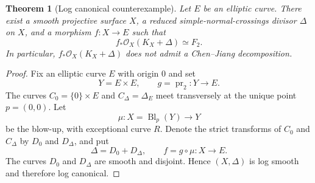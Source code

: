 \documentclass[11pt,letterpaper]{article}
\theoremstyle{paper}
\newtheorem{theorem}{Theorem}[section]
\newcommand{\OO}{\mathcal O}
\DeclareMathOperator{\pr}{pr}
\DeclareMathOperator{\Bl}{Bl}
\begin{document}
\begin{theorem}[Log canonical counterexample]\label{thm:lc}
Let $E$ be an elliptic curve. There exist a smooth projective surface $X$, a reduced simple-normal-crossings divisor $\Delta$ on $X$, and a morphism $f:X\to E$ such that
\[
f_*\OO_X(K_X+\Delta)\simeq F_2.
\]
In particular, $f_*\OO_X(K_X+\Delta)$ does not admit a Chen--Jiang decomposition.
\end{theorem}
\begin{proof}
Fix an elliptic curve $E$ with origin $0$ and set
\[
Y=E\times E,\qquad g=\pr_2:Y\longrightarrow E.
\]
The curves $C_0=\{0\}\times E$ and $C_\Delta=\Delta_E$ meet transversely at the unique point $p=(0,0)$. Let
\[
\mu:X=\Bl_p(Y)\longrightarrow Y
\]
be the blow-up, with exceptional curve $R$. Denote the strict transforms of $C_0$ and $C_\Delta$ by $D_0$ and $D_\Delta$, and put
\[
\Delta=D_0+D_\Delta,\qquad f=g\circ\mu:X\longrightarrow E.
\]
The curves $D_0$ and $D_\Delta$ are smooth and disjoint. Hence $(X,\Delta)$ is log smooth and therefore log canonical.


\end{proof}
\end{document}
